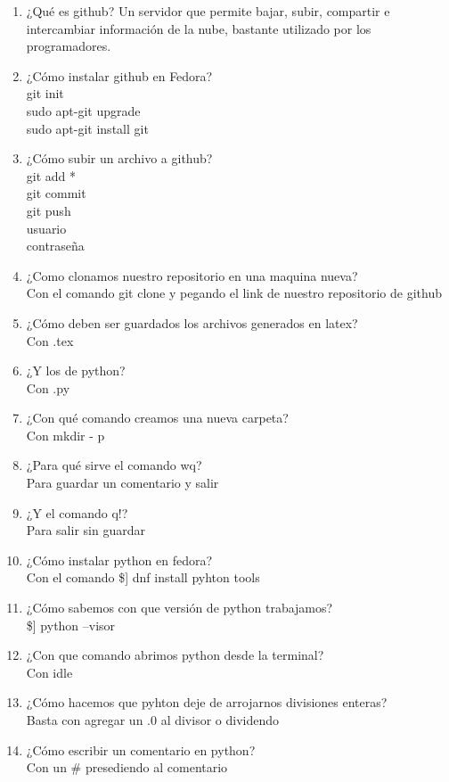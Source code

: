 \documentclass[letterpaper, 12pt, oneside]{article}%
\begin{document}
\begin{enumerate}
\item ¿Qué es github?
Un servidor que permite bajar, subir, compartir e intercambiar información de la nube, bastante utilizado por los programadores.
\item ¿Cómo instalar github en Fedora?\\
git init\\
sudo apt-git upgrade\\
sudo apt-git install git\\
\item ¿Cómo subir un archivo a github?\\
 git add *\\ git commit\\ git push\\usuario\\contraseña
\item ¿Como clonamos nuestro repositorio en una maquina nueva?\\
Con el comando git clone y pegando el link de nuestro repositorio de github
\item ¿Cómo deben ser guardados los archivos generados en latex?\\
Con .tex
\item ¿Y los de python?\\
Con .py
\item ¿Con qué comando creamos una nueva carpeta?\\
Con mkdir - p
\item ¿Para qué sirve el comando wq?\\
Para guardar un comentario y salir
\item ¿Y el comando q!?\\
Para salir sin guardar
\item ¿Cómo instalar python en fedora?\\
Con el comando \$] dnf install pyhton tools
\item ¿Cómo sabemos con que versión de python trabajamos?\\
\$] python --visor\\
\item ¿Con que comando abrimos python desde la terminal?\\
Con idle
\item ¿Cómo hacemos que pyhton deje de arrojarnos divisiones enteras?\\
Basta con agregar un .0 al divisor o dividendo
\item ¿Cómo escribir un comentario en python?\\
Con un \# presediendo al comentario

\end{enumerate}
\end{document}
